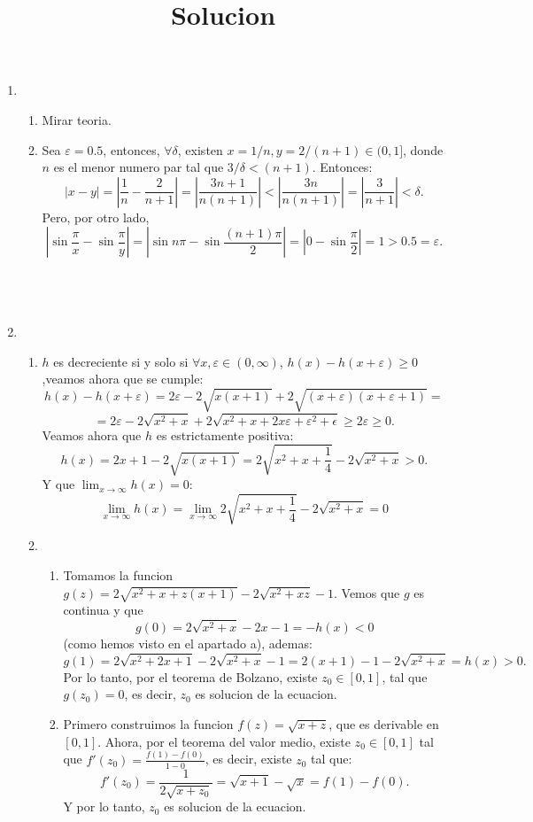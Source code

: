 \documentclass{article}
\newcommand{\abs}[1]{\left\lvert #1 \right\rvert}
\begin{document}
\newpage
\title{Solucion}
\date{}
\maketitle

\begin{enumerate}
\item \begin{enumerate}
\item Mirar teoria.
\item Sea $\varepsilon = 0.5$, entonces, $\forall \delta$, existen $x = 1/n, y = 2/(n+1) \in (0, 1]$,
donde $n$ es el menor numero par tal que $3/\delta < (n+1)$. Entonces:
\[
\abs{x - y} = \abs{\frac{1}{n} - \frac{2}{n+1}} = \abs{\frac{3n+1}{n(n+1)}} < \abs{\frac{3n}{n(n+1)}} =
\abs{\frac{3}{n+1}} < \delta.
\]
Pero, por otro lado,
\[
\abs{ \sin{\frac{\pi}{x}} - \sin{\frac{\pi}{y}} } = \abs{\sin n\pi - \sin \frac{(n+1)\pi}{2}} =
\abs{0 - \sin \frac{\pi}{2} } = 1 > 0.5 = \varepsilon.
\]
\\ \\ \\
\end{enumerate}

\item \begin{enumerate}
\item $h$ es decreciente si y solo si $\forall x, \varepsilon \in (0, \infty)$,
$h(x) - h(x+\varepsilon) \geq 0$,veamos ahora que se cumple:
\[
h(x) - h(x+\varepsilon) = 2\varepsilon - 2\sqrt{x(x+1)} + 2\sqrt{(x+\varepsilon)(x+\varepsilon+1)} =
\]
\[
= 2\varepsilon - 2\sqrt{x^2+x} +
2\sqrt{x^2 + x + 2x\varepsilon+ \varepsilon^2 + \epsilon} \geq 2\varepsilon \geq 0.
\]
Veamos ahora que $h$ es estrictamente positiva:
\[
h(x) = 2x + 1 - 2\sqrt{x(x+1)} = 2\sqrt{x^2 + x + \frac{1}{4}} - 2\sqrt{x^2+x} > 0.
\]
Y que $\displaystyle \lim_{x \to \infty} h(x) = 0$:
\[
\lim_{x \to \infty} h(x) = \lim_{x \to \infty} 2\sqrt{x^2 + x + \frac{1}{4}} - 2\sqrt{x^2+x} = 0
\]
\item \begin{enumerate}
\item Tomamos la funcion $g(z) = 2\sqrt{x^2+x + z(x+1)} - 2\sqrt{x^2+xz} - 1$. Vemos que $g$ es
continua y que
\[
g(0) = 2\sqrt{x^2+x} - 2x - 1 = -h(x) < 0
\]
(como hemos visto en el apartado a), ademas:
\[
g(1) = 2\sqrt{x^2+2x+1} - 2\sqrt{x^2+x} -1 = 2(x+1) - 1 -2\sqrt{x^2+x} = h(x) > 0.
\]
Por lo tanto, por el teorema de Bolzano, existe $z_0 \in [0,1]$, tal que $g(z_0) = 0$, es decir, $z_0$
es solucion de la ecuacion.
\item Primero construimos la funcion $f(z) = \sqrt{x+z}$, que es derivable en $[0,1]$. Ahora, por
el teorema del valor medio, existe $z_0 \in [0,1]$ tal que
$\displaystyle f'(z_0) = \frac{f(1) - f(0)}{1 - 0}$, es decir, existe $z_0$ tal que:
\[
f'(z_0) = \frac{1}{2\sqrt{x+z_0}} = \sqrt{x+1} - \sqrt{x} = f(1) - f(0).
\]
Y por lo tanto, $z_0$ es solucion de la ecuacion.


\end{enumerate}
\end{enumerate}
\end{enumerate}
\end{document}
